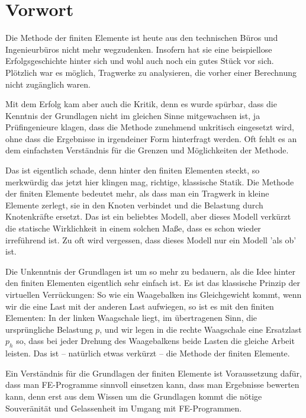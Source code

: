 \chapter*{Vorwort}

 Die Methode der finiten Elemente ist heute aus den
technischen B\"{u}ros und Ingenieurb\"{u}ros nicht mehr wegzudenken. Insofern hat sie eine
beispiellose Erfolgsgeschichte hinter sich und wohl auch noch ein gutes St\"{u}ck vor sich.
Pl\"{o}tzlich war es m\"{o}glich, Tragwerke zu analysieren, die vorher einer Berechnung nicht
zug\"{a}nglich waren.

Mit dem Erfolg kam aber auch die Kritik, denn es wurde sp\"{u}rbar, dass die Kenntnis
der Grundlagen nicht im gleichen Sinne mitgewachsen ist, ja Pr\"{u}fingenieure klagen, dass
die Methode zunehmend unkritisch eingesetzt wird, ohne dass die Ergebnisse in
irgendeiner Form hinterfragt werden. Oft fehlt es an dem einfachsten Verst\"{a}ndnis f\"{u}r die
Grenzen und M\"{o}glichkeiten der Methode.

Das ist eigentlich schade, denn hinter den finiten Elementen steckt, so merkw\"{u}rdig das
jetzt hier klingen mag, \hlq richtige\grq, klassische Statik. Die Methode der finiten
Elemente bedeutet mehr, als dass man ein Tragwerk in kleine Elemente zerlegt, sie in
den Knoten verbindet und die Belastung durch Knotenkr\"{a}fte ersetzt. Das ist ein beliebtes
Modell, aber dieses Modell verk\"{u}rzt die statische Wirklichkeit in einem solchen Ma{\ss}e,
dass es schon wieder irref\"{u}hrend ist. Zu oft wird vergessen, dass dieses Modell nur ein
Modell 'als ob' ist.

Die Unkenntnis der Grundlagen ist um so mehr zu bedauern, als die Idee hinter den
finiten Elementen eigentlich sehr einfach ist. Es ist das klassische Prinzip der
virtuellen Verr\"{u}ckungen: So wie ein Waagebalken ins Gleichgewicht kommt, wenn wir die
eine Last mit der anderen Last aufwiegen, so ist es mit den finiten Elementen: In der
linken Waagschale liegt, im \"{u}bertragenen Sinn, die urspr\"{u}ngliche Belastung $p$, und wir
legen in die rechte Waagschale eine Ersatzlast $p_h$ so, dass bei jeder Drehung des
Waagebalkens beide Lasten die gleiche Arbeit leisten. Das ist -- nat\"{u}rlich etwas
verk\"{u}rzt -- die Methode der finiten Elemente.

Ein Verst\"{a}ndnis f\"{u}r die Grundlagen der finiten Elemente ist Voraussetzung daf\"{u}r, dass man
FE-Programme sinnvoll einsetzen kann, dass man Ergebnisse bewerten kann, denn erst aus dem Wissen
um die Grundlagen kommt die n\"{o}tige Souver\"{a}nit\"{a}t und Gelassenheit im Umgang mit
FE-Programmen.

